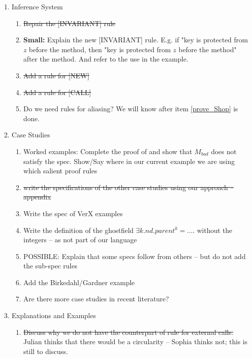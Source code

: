 \documentclass[acmsmall,review,anonymous]{acmart}\settopmatter{printfolios=true}
\begin{document}
 
\begin{enumerate}
\item
Inference System
\begin{enumerate}
\item
\st{Repair the [INVARIANT] rule}

\item
{\textbf{Small:}} Explain the new [INVARIANT] rule. E.g. if "key is protected from $z$ before the method, then "key is protected from $z$ before the method"   after the method. And refer to the use in the example.

\item
\st{Add a rule for [NEW]}

\item
\st{Add a rule for [CALL]}

\item
Do we need rules for aliasing? We will know after item \ref{prove_Shop} is done.
\end{enumerate}


\item 
Case Studies 
\begin{enumerate}
\item
\label{prove_Shop}
Worked examples: Complete the proof of  and show that $M_{bad}$ does not satisfy the spec.  
Show/Say where in our current example we are using which salient proof rules

\item
\st{write the specifications of the other case studies using our approach -- appendix} 
\item
Write the spec of VerX examples

\item
Write the definition of the ghostfield $\exists k. nd.parent ^k = ....$ without the integers -- as not part of our language

\item
POSSIBLE: Explain that some specs follow from others -- but do not add the sub-spec rules

\item
Add the Birkedahl/Gardner example

\item
Are there more case studies in recent literature? 

\end{enumerate}
\item
Explanations  and Examples
\begin{enumerate}

\item 
\st{Discuss why we do not have the counterpart of rule {}  for external calls. } 
Julian thinks that there would be a circularity -- Sophia thinks not; this is still to discuss.  


\end{enumerate}
\end{enumerate}
\end{document}
